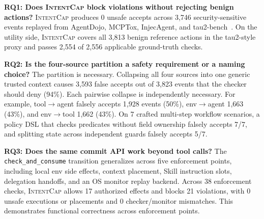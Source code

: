 \documentclass[sigconf,nonacm]{acmart}
\newcommand{\sys}{\textsc{IntentCap}\xspace}
\begin{document}
\textbf{RQ1: Does \sys block violations without rejecting benign actions?}
\sys produces 0 unsafe accepts across 3,746 security-sensitive events replayed from AgentDojo, MCPTox, InjecAgent, and tau2-bench~\cite{agentdojo,mcptox,injecagent,tau2bench}.
On the utility side, \sys covers all 3,813 benign reference actions in the tau2-style proxy and passes 2,554 of 2,556 applicable ground-truth checks.

\textbf{RQ2: Is the four-source partition a safety requirement or a naming choice?}
The partition is necessary.
Collapsing all four sources into one generic trusted context causes 3,593 false accepts out of 3,823 events that the checker should deny (94\%).
Each pairwise collapse is independently necessary.
For example, tool$\rightarrow$agent falsely accepts 1,928 events (50\%), env$\rightarrow$agent 1,663 (43\%), and env$\rightarrow$tool 1,662 (43\%).
On 7 crafted multi-step workflow scenarios, a policy DSL that checks predicates without field ownership falsely accepts 7/7, and splitting state across independent guards falsely accepts 5/7.

\textbf{RQ3: Does the same commit API work beyond tool calls?}
The \texttt{check\_and\_consume} transition generalizes across five enforcement points, including local env side effects, context placement, Skill instruction slots, delegation handoffs, and an OS monitor replay backend.
Across 38 enforcement checks, \sys allows 17 authorized effects and blocks 21 violations, with 0 unsafe executions or placements and 0 checker/monitor mismatches.
This demonstrates functional correctness across enforcement points.
\end{document}
